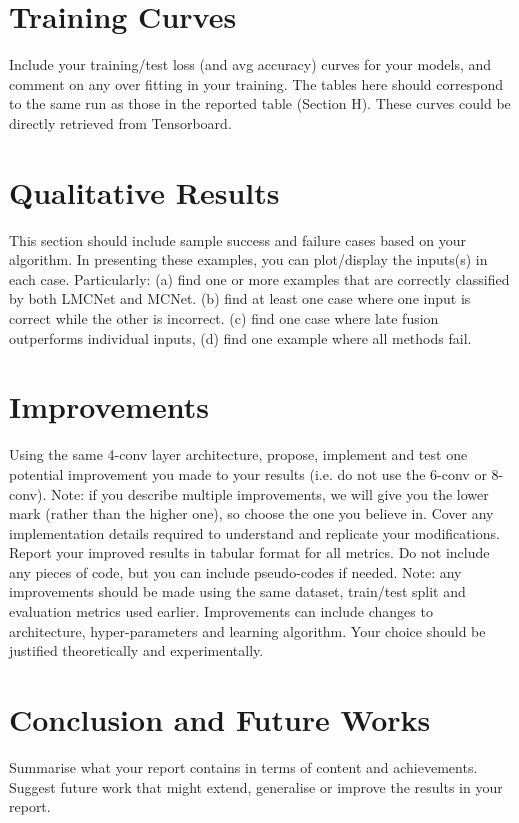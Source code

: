 \documentclass[conference]{IEEEtran}
\begin{document}
\section{Training Curves}
Include your training/test loss (and avg accuracy) curves for your models, and comment on any over fitting in your training. The tables here should correspond to the same run as those in the reported table (Section H). These curves could be directly retrieved from Tensorboard. 

\section{Qualitative Results}
This section should include sample success and failure cases based on your algorithm. In presenting these examples, you can plot/display the inputs(s) in each case. Particularly: (a) find one or more examples that are correctly classified by both LMCNet and MCNet. (b) find at least one case where one input is correct while the other is incorrect. (c) find one case where late fusion outperforms individual inputs, (d) find one example where all methods fail. 

\section{Improvements}
Using the same 4-conv layer architecture, propose, implement and test one potential improvement you made to your results (i.e. do not use the 6-conv or 8-conv). Note: if you describe multiple improvements, we will give you the lower mark (rather than the higher one), so choose the one you believe in. Cover any implementation details required to understand and replicate your modifications. Report your improved results in tabular format for all metrics. Do not include any pieces of code, but you can include pseudo-codes if needed. Note: any improvements should be made using the same dataset, train/test split and evaluation metrics used earlier. Improvements can include changes to architecture, hyper-parameters and learning algorithm. Your choice should be justified theoretically and experimentally. 

\section{Conclusion and Future Works}
Summarise what your report contains in terms of content and achievements. 
Suggest future work that might extend, generalise or improve the results in your report. 
\end{document}
